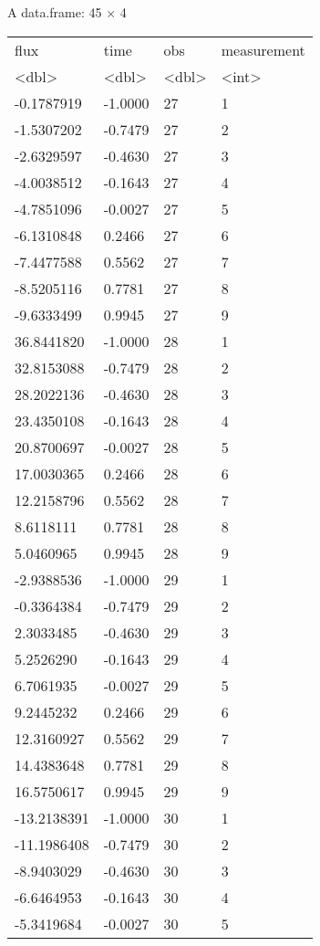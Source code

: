 \documentclass[11pt]{article}
\begin{document}
    A data.frame: 45 × 4
\begin{tabular}{llll}
 flux & time & obs & measurement\\
 <dbl> & <dbl> & <dbl> & <int>\\
\hline
	  -0.1787919 & -1.0000 & 27 & 1\\
	  -1.5307202 & -0.7479 & 27 & 2\\
	  -2.6329597 & -0.4630 & 27 & 3\\
	  -4.0038512 & -0.1643 & 27 & 4\\
	  -4.7851096 & -0.0027 & 27 & 5\\
	  -6.1310848 &  0.2466 & 27 & 6\\
	  -7.4477588 &  0.5562 & 27 & 7\\
	  -8.5205116 &  0.7781 & 27 & 8\\
	  -9.6333499 &  0.9945 & 27 & 9\\
	  36.8441820 & -1.0000 & 28 & 1\\
	  32.8153088 & -0.7479 & 28 & 2\\
	  28.2022136 & -0.4630 & 28 & 3\\
	  23.4350108 & -0.1643 & 28 & 4\\
	  20.8700697 & -0.0027 & 28 & 5\\
	  17.0030365 &  0.2466 & 28 & 6\\
	  12.2158796 &  0.5562 & 28 & 7\\
	   8.6118111 &  0.7781 & 28 & 8\\
	   5.0460965 &  0.9945 & 28 & 9\\
	  -2.9388536 & -1.0000 & 29 & 1\\
	  -0.3364384 & -0.7479 & 29 & 2\\
	   2.3033485 & -0.4630 & 29 & 3\\
	   5.2526290 & -0.1643 & 29 & 4\\
	   6.7061935 & -0.0027 & 29 & 5\\
	   9.2445232 &  0.2466 & 29 & 6\\
	  12.3160927 &  0.5562 & 29 & 7\\
	  14.4383648 &  0.7781 & 29 & 8\\
	  16.5750617 &  0.9945 & 29 & 9\\
	 -13.2138391 & -1.0000 & 30 & 1\\
	 -11.1986408 & -0.7479 & 30 & 2\\
	  -8.9403029 & -0.4630 & 30 & 3\\
	  -6.6464953 & -0.1643 & 30 & 4\\
	  -5.3419684 & -0.0027 & 30 & 5\\

\end{tabular}
\end{document}

